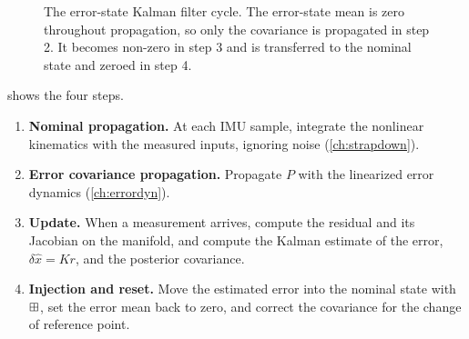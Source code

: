 \begin{figure}[t]
\centering
{}
\caption{The error-state Kalman filter cycle. The error-state mean is zero throughout propagation, so only the covariance is propagated in step 2. It
becomes non-zero in step 3 and is transferred to the nominal state and zeroed in step 4.}
\label{fig:eskf-cycle}
\end{figure}

 shows the four steps.
\begin{enumerate}
  \item \textbf{Nominal propagation.} At each IMU sample, integrate the nonlinear kinematics with the measured inputs, ignoring noise
        (\cref{ch:strapdown}).
  \item \textbf{Error covariance propagation.} Propagate $P$ with the linearized error dynamics (\cref{ch:errordyn}).
  \item \textbf{Update.} When a measurement arrives, compute the residual and its Jacobian on the manifold, and compute the Kalman estimate of the
        error, $\delta\hat x = Kr$, and the posterior covariance.
  \item \textbf{Injection and reset.} Move the estimated error into the nominal state with $\boxplus$, set the error mean back to zero, and correct the
        covariance for the change of reference point.
\end{enumerate}

